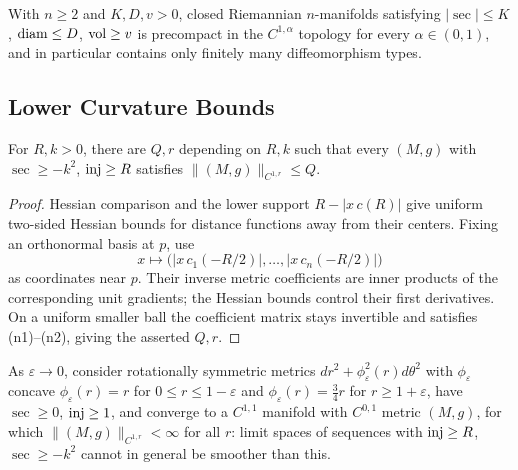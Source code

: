 \begin{corollary}
  \label{cor:pet-ch11-cheeger-diam-vol-finiteness}
  With $n\ge2$ and $K,D,v>0$, closed Riemannian $n$-manifolds satisfying
  $|\sec|\le K$, $\operatorname{diam}\le D$, $\operatorname{vol}\ge v$ is precompact in the $C^{1,\alpha}$
  topology for every $\alpha\in(0,1)$, and in particular contains only
  finitely many diffeomorphism types.
\end{corollary}

\subsection{Lower Curvature Bounds}

\begin{theorem}
  \label{thm:pet-ch11-lower-sec-bound-injectivity-norm-control}
  For $R,k>0$, there are $Q,r$ depending on $R,k$ such that every $(M,g)$
  with $\sec\ge-k^2$, $\operatorname{inj}\ge R$ satisfies $\|(M,g)\|_{C^{1,r}}\le Q$.
\end{theorem}
\begin{proof}
  \sketch
  Hessian comparison and the lower support \(R-|x\,c(R)|\) give uniform two-sided Hessian bounds for distance functions away from their centers. Fixing an orthonormal basis at \(p\), use
  \[
    x\longmapsto\bigl(|x\,c_1(-R/2)|,\ldots,|x\,c_n(-R/2)|\bigr)
  \]
  as coordinates near \(p\). Their inverse metric coefficients are inner products of the corresponding unit gradients; the Hessian bounds control their first derivatives. On a uniform smaller ball the coefficient matrix stays invertible and satisfies (n1)--(n2), giving the asserted \(Q,r\).
\end{proof}


\begin{example}
  \label{ex:pet-ch11-optimality-lower-curvature-example}
  As $\varepsilon\to0$, consider rotationally symmetric metrics
  $dr^2+\phi_\varepsilon^2(r)d\theta^2$ with $\phi_\varepsilon$ concave
  $\phi_\varepsilon(r)=r$ for $0\le r\le1-\varepsilon$ and
  $\phi_\varepsilon(r)=\tfrac34r$ for $r\ge1+\varepsilon$, have $\sec\ge0$,
  $\operatorname{inj}\ge1$, and converge to a $C^{1,1}$ manifold with $C^{0,1}$ metric
  $(M,g)$, for which $\|(M,g)\|_{C^{1,r}}<\infty$ for all $r$: limit spaces
  of sequences with $\operatorname{inj}\ge R$, $\sec\ge-k^2$ cannot in general be smoother
  than this.
\end{example}

